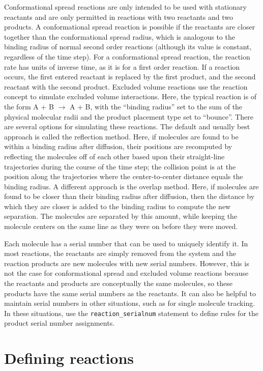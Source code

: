 \documentclass {scrbook}
\newcommand {\ttt} {\texttt}
\begin{document}
Conformational spread reactions are only intended to be used with stationary reactants and are only permitted in reactions with two reactants and two products. A conformational spread reaction is possible if the reactants are closer together than the conformational spread radius, which is analogous to the binding radius of normal second order reactions (although its value is constant, regardless of the time step). For a conformational spread reaction, the reaction rate has units of inverse time, as it is for a first order reaction. If a reaction occurs, the first entered reactant is replaced by the first product, and the second reactant with the second product.
Excluded volume reactions use the reaction concept to simulate excluded volume interactions. Here, the typical reaction is of the form A + B $\rightarrow$ A + B, with the ``binding radius'' set to the sum of the physical molecular radii and the product placement type set to ``bounce''. There are several options for simulating these reactions. The default and usually best approach is called the reflection method. Here, if molecules are found to be within a binding radius after diffusion, their positions are recomputed by reflecting the molecules off of each other based upon their straight-line trajectories during the course of the time step; the collision point is at the position along the trajectories where the center-to-center distance equals the binding radius. A different approach is the overlap method. Here, if molecules are found to be closer than their binding radius after diffusion, then the distance by which they are closer is added to the binding radius to compute the new separation. The molecules are separated by this amount, while keeping the molecule centers on the same line as they were on before they were moved.

Each molecule has a serial number that can be used to uniquely identify it. In most reactions, the reactants are simply removed from the system and the reaction products are new molecules with new serial numbers. However, this is not the case for conformational spread and excluded volume reactions because the reactants and products are conceptually the same molecules, so these products have the same serial numbers as the reactants. It can also be helpful to maintain serial numbers in other situations, such as for single molecule tracking. In these situations, use the \ttt{reaction\_serialnum} statement to define rules for the product serial number assignments.

\section{Defining reactions}
\end{document}

